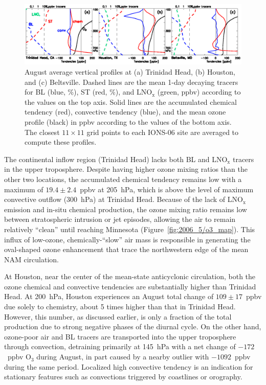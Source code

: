  \begin{figure}
 \noindent\includegraphics[width=40pc]{figures/tendency_v.eps}
 \caption{August average vertical profiles at (a) Trinidad Head, (b) Houston, and (c)
Beltsville. Dashed lines are the mean 1-day decaying tracers for BL (blue, \%),
ST (red, \%), and LNO$_{\mathrm{x}}$ (green, ppbv) according to the
values on the top axis. Solid lines are the accumulated chemical
tendency (red), convective tendency (blue), and the mean ozone profile
(black) in ppbv according to the values of the bottom axis. The closest
$11\times11$ grid points to each IONS-06 site are averaged to compute
these profiles.}
 \label{fig:tend_v}
 \end{figure}

The continental inflow region (Trinidad Head) lacks both BL and LNO$_{\mathrm{x}}$
tracers in the upper troposphere. Despite having higher ozone mixing ratios than the
other two locations, the accumulated chemical tendency remains low with a maximum of
$19.4\pm2.4$~ppbv at 205~hPa, which is above the level of maximum
convective outflow (300~hPa) at Trinidad Head. Because of the lack of
LNO$_{\mathrm{x}}$ emission and  in-situ chemical production,
the ozone mixing ratio remains low between stratospheric intrusion or jet episodes, allowing
the air to remain relatively ``clean'' until reaching Minnesota (Figure~\ref{fig:2006_5/o3_map}). This influx of low-ozone, 
chemically-``slow'' air mass is responsible in generating the oval-shaped ozone
enhancement that trace the northwestern edge of the mean NAM circulation.

At Houston, near the center of the mean-state anticyclonic circulation, both the ozone
chemical and convective tendencies are substantially higher than Trinidad Head. At
200~hPa, Houston experiences an August total change of $109\pm17$~ppbv due
solely to chemistry, about 5 times higher than that in Trinidad Head. However, this
number, as discussed earlier, is only a fraction of the total production due to strong negative phases of the
diurnal cycle. On the other hand, ozone-poor air and BL tracers are transported into
the upper troposphere through convection, detraining primarily at 145~hPa with a
net change of $-172$~ppbv O$_3$ during August, in part caused by a nearby outlier
with $-1092$~ppbv during the same period. Localized high convective tendency is
an indication for stationary features such as convections triggered by coastlines
or orography.

